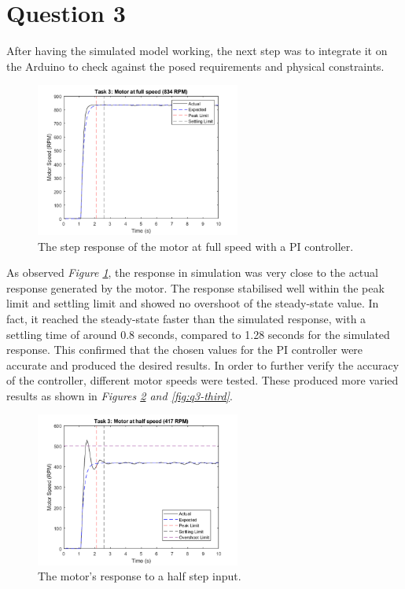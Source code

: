 \documentclass[11pt, onecolumn]{article}
\begin{document}
\section*{Question 3}
\par After having the simulated model working, the next step was to integrate it on the Arduino to check against the posed requirements and physical constraints.
\begin{figure}[h!]
    \centering
    \includegraphics[width=0.6\textwidth]{q3-g1.png}
    \caption{The step response of the motor at full speed with a PI controller.}
    \label{fig:q3-first}
\end{figure}
\par As observed \textit{Figure \ref{fig:q3-first}}, the response in simulation was very close to the actual response generated by the motor. The response stabilised well within the peak limit and settling limit and showed no overshoot of the steady-state value. In fact, it reached the steady-state faster than the simulated response, with a settling time of around 0.8 seconds, compared to 1.28 seconds for the simulated response. This confirmed that the chosen values for the PI controller were accurate and produced the desired results. In order to further verify the accuracy of the controller, different motor speeds were tested. These produced more varied results as shown in \textit{Figures \ref{fig:q3-second} and \ref{fig:q3-third}}.
\begin{figure}[h!]
    \centering
    \includegraphics[width=0.6\textwidth]{q3-g2.png}
    \caption{The motor's response to a half step input.}
    \label{fig:q3-second}
\end{figure}
\end{document}
